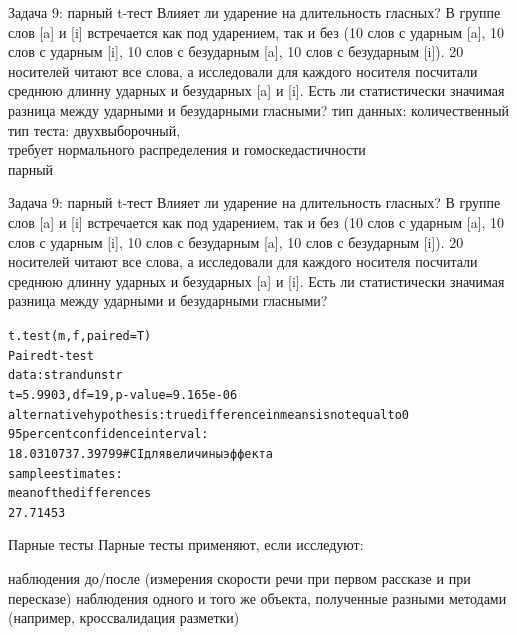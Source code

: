 \begin{frame}{Задача 9: парный t-тест}
Влияет ли ударение на длительность гласных? В группе слов [a] и [i] встречается как под ударением, так и без (10 слов с ударным [a], 10 слов с ударным [i], 10 слов с безударным [a], 10 слов с безударным [i]). 20 носителей читают все слова, а исследовали для каждого носителя посчитали среднюю длинну ударных и безударных [a] и [i]. Есть ли статистически значимая разница между ударными и безударными гласными?
\vfill
тип данных: количественный\\
тип теста: двухвыборочный,\\
требует нормального распределения и гомоскедастичности\\
парный
\end{frame}
\begin{frame}{Задача 9: парный t-тест}
Влияет ли ударение на длительность гласных? В группе слов [a] и [i] встречается как под ударением, так и без (10 слов с ударным [a], 10 слов с ударным [i], 10 слов с безударным [a], 10 слов с безударным [i]). 20 носителей читают все слова, а исследовали для каждого носителя посчитали среднюю длинну ударных и безударных [a] и [i]. Есть ли статистически значимая разница между ударными и безударными гласными?\vfill
\scriptsize
\begin{alltt}
\alert{t.test(m, f, paired = T)}\medskip\\
Paired t-test\\
data: str and unstr\\
\alert{t = 5.9903, df = 19, p-value = 9.165e-06}\\
alternative hypothesis: true difference in means is not equal to 0\\
95 percent confidence interval:\\
18.03107 37.39799 \hfill \# CI для величины эффекта\\
sample estimates:\\
mean of the differences\\
27.71453
\end{alltt}
\normalsize
\end{frame}
\begin{frame}{Парные тесты}
Парные тесты применяют, если исследуют:
\begin{itemize}
\mytem наблюдения до/после (измерения скорости речи при первом рассказе и при пересказе)
\mytem наблюдения одного и того же объекта, полученные разными методами (например, кроссвалидация разметки)
\end{itemize}
\end{frame}
